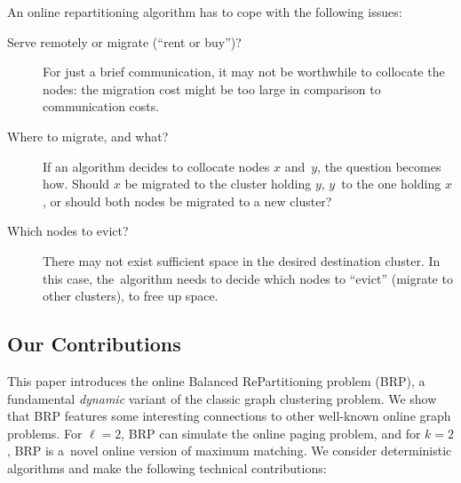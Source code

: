 \documentclass{siamart190516}
\begin{document}
An online repartitioning algorithm has to cope with the following issues:

\begin{description}

\item[Serve remotely or migrate (``rent or buy'')?] For just a brief communication, it may not be worthwhile to collocate the nodes: the migration cost might
be too large in comparison to communication costs.

\item[Where to migrate, and what?]
If an algorithm decides to collocate nodes $x$ and~$y$, the question becomes
how. Should $x$ be migrated to the cluster holding $y$, $y$~to the one holding
$x$, or should both nodes be migrated to a new cluster?

\item[Which nodes to evict?]
There may not exist sufficient space in the desired destination cluster. In
this case, the~algorithm needs to decide which nodes to ``evict'' (migrate to
other clusters), to free up space.

\end{description}


\subsection{Our Contributions}

This paper introduces the online Balanced RePartitioning problem (BRP),
a fundamental \emph{dynamic} variant of the classic graph clustering problem. 
We show that BRP features some interesting connections to other well-known
online graph problems. For $\ell=2$, BRP can simulate the online paging problem,
and for $k=2$, BRP is a~novel online version of maximum matching.
We consider deterministic algorithms and make the following technical
contributions:
\end{document}
